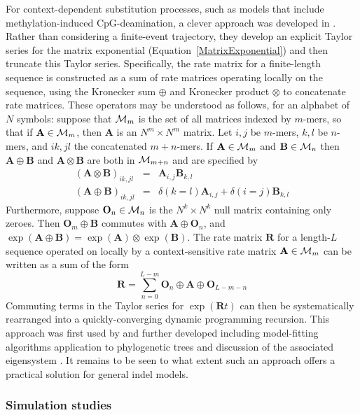 \documentclass{bmcart}
\newcommand{\matr}[1]{\mathbf{#1}}
\newcommand{\eqref}[1]{Equation~\ref{#1}}
\newcommand{\ratematrix}{\matr{R}}
\begin{document}
For context-dependent substitution processes,
such as models that include methylation-induced CpG-deamination,
a clever approach was developed in \cite{LunterHein04}.
Rather than considering a finite-event trajectory, they develop an explicit Taylor series for the matrix exponential
(\eqref{MatrixExponential}) and then truncate this Taylor series.
Specifically, the rate matrix for a finite-length sequence is constructed
as a sum of rate matrices operating locally on the sequence, using the Kronecker sum $\oplus$
and Kronecker product $\otimes$ to concatenate rate matrices.
These operators may be understood as follows, for an alphabet of $N$ symbols:
suppose that ${\cal M}_m$ is the set of all matrices indexed by $m$-mers,
so that if $\matr{A} \in {\cal M}_m$, then $\matr{A}$ is an $N^m \times N^m$ matrix.
Let $i,j$ be $m$-mers, $k,l$ be $n$-mers, and $ik, jl$ the concatenated $m+n$-mers.
If $\matr{A} \in {\cal M}_m$ and $\matr{B} \in {\cal M}_n$
then $\matr{A} \oplus \matr{B}$ and $\matr{A} \otimes \matr{B}$ are both in ${\cal M}_{m+n}$
and are specified by
\begin{eqnarray}
  \left( \matr{A} \otimes \matr{B} \right)_{ik,jl} & = & \matr{A}_{i,j} \matr{B}_{k,l} \\
  \left( \matr{A} \oplus \matr{B} \right)_{ik,jl} & = & \delta(k=l) \matr{A}_{i,j} + \delta(i=j) \matr{B}_{k,l}
\end{eqnarray}
Furthermore, suppose $\matr{O}_n \in {\cal M}_n$ is the $N^k \times N^k$ null matrix containing only zeroes.
Then $\matr{O}_m \oplus \matr{B}$ commutes with $\matr{A} \oplus \matr{O}_n$,
and $\exp(\matr{A} \oplus \matr{B}) = \exp(\matr{A}) \otimes \exp(\matr{B})$.
The rate matrix $\ratematrix$ for a length-$L$ sequence operated on locally by a context-sensitive rate matrix $\matr{A} \in {\cal M}_m$ can be written as a sum of the form
\[
\ratematrix = \sum_{n=0}^{L-m} \matr{O}_n \oplus \matr{A} \oplus \matr{O}_{L-m-n}
\]
Commuting terms in the Taylor series for $\exp(\ratematrix t)$ can then be systematically rearranged into a quickly-converging dynamic programming recursion.
This approach was first used by \cite{LunterHein04} and further developed
including model-fitting algorithms \cite{Hobolth2008}
application to phylogenetic trees \cite{BerardGueguen2012}
and discussion of the associated eigensystem \cite{pmid21827770,pmid26135206}.
It remains to be seen to what extent such an approach offers a practical solution for general indel models.

\subsubsection*{Simulation studies}
\end{document}
